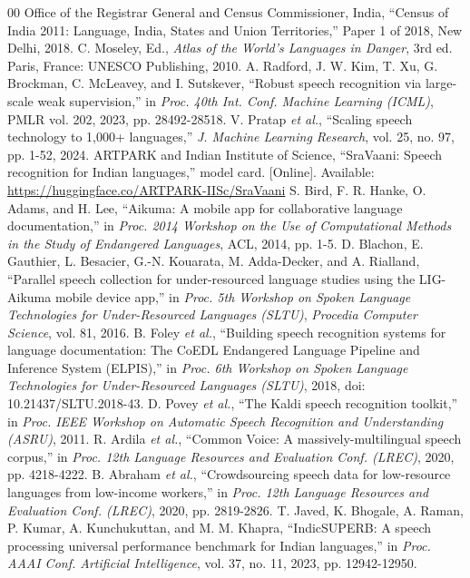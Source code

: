 \documentclass[conference]{IEEEtran}
\begin{document}
\begin{thebibliography}{00}
 Office of the Registrar General and Census Commissioner, India, ``Census of India 2011: Language, India, States and Union Territories,'' Paper 1 of 2018, New Delhi, 2018.
 C. Moseley, Ed., \textit{Atlas of the World's Languages in Danger}, 3rd ed. Paris, France: UNESCO Publishing, 2010.
 A. Radford, J. W. Kim, T. Xu, G. Brockman, C. McLeavey, and I. Sutskever, ``Robust speech recognition via large-scale weak supervision,'' in \textit{Proc. 40th Int. Conf. Machine Learning (ICML)}, PMLR vol. 202, 2023, pp. 28492-28518.
 V. Pratap \textit{et al.}, ``Scaling speech technology to 1,000+ languages,'' \textit{J. Machine Learning Research}, vol. 25, no. 97, pp. 1-52, 2024.
 ARTPARK and Indian Institute of Science, ``SraVaani: Speech recognition for Indian languages,'' model card. [Online]. Available: \url{https://huggingface.co/ARTPARK-IISc/SraVaani}
 S. Bird, F. R. Hanke, O. Adams, and H. Lee, ``Aikuma: A mobile app for collaborative language documentation,'' in \textit{Proc. 2014 Workshop on the Use of Computational Methods in the Study of Endangered Languages}, ACL, 2014, pp. 1-5.
 D. Blachon, E. Gauthier, L. Besacier, G.-N. Kouarata, M. Adda-Decker, and A. Rialland, ``Parallel speech collection for under-resourced language studies using the LIG-Aikuma mobile device app,'' in \textit{Proc. 5th Workshop on Spoken Language Technologies for Under-Resourced Languages (SLTU)}, \textit{Procedia Computer Science}, vol. 81, 2016.
 B. Foley \textit{et al.}, ``Building speech recognition systems for language documentation: The CoEDL Endangered Language Pipeline and Inference System (ELPIS),'' in \textit{Proc. 6th Workshop on Spoken Language Technologies for Under-Resourced Languages (SLTU)}, 2018, doi: 10.21437/SLTU.2018-43.
 D. Povey \textit{et al.}, ``The Kaldi speech recognition toolkit,'' in \textit{Proc. IEEE Workshop on Automatic Speech Recognition and Understanding (ASRU)}, 2011.
 R. Ardila \textit{et al.}, ``Common Voice: A massively-multilingual speech corpus,'' in \textit{Proc. 12th Language Resources and Evaluation Conf. (LREC)}, 2020, pp. 4218-4222.
 B. Abraham \textit{et al.}, ``Crowdsourcing speech data for low-resource languages from low-income workers,'' in \textit{Proc. 12th Language Resources and Evaluation Conf. (LREC)}, 2020, pp. 2819-2826.
 T. Javed, K. Bhogale, A. Raman, P. Kumar, A. Kunchukuttan, and M. M. Khapra, ``IndicSUPERB: A speech processing universal performance benchmark for Indian languages,'' in \textit{Proc. AAAI Conf. Artificial Intelligence}, vol. 37, no. 11, 2023, pp. 12942-12950.

\end{thebibliography}
\end{document}
